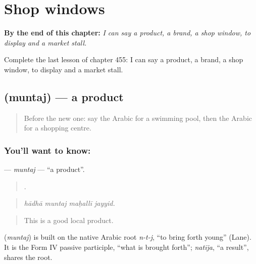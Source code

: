 
\chapter{Shop windows}
\label{ch:ar-shop-windows}

\begin{chapteropening}
\textbf{By the end of this chapter:} \emph{I can say a product, a brand, a shop window, to display and a market stall.}

Complete the last lesson of chapter 455: I can say a product, a brand, a shop window, to display and a market stall.
\end{chapteropening}

\section[\texorpdfstring{\ar{منتج} (muntaj)}{منتج (muntaj)}]{ (muntaj) — a product}

\label{lesson:AR-C455-muntaj}



\begin{quote}
Before the new one: say the Arabic for a swimming pool, then the Arabic for a shopping centre.
\end{quote}

\subsection*{You'll want to know: }
\textbf{} — \emph{muntaj} — \textquotedblleft{}a product\textquotedblright{}.

\begin{quote}
   .
\end{quote}

\begin{quote}
\emph{hādhā muntaj maḥallī jayyid.}
\end{quote}

\begin{quote}
This is a good local product.
\end{quote}

\begin{cousinweb}
\textbf{} (\emph{muntaj}) is built on the native Arabic root \emph{n-t-j}, \textquotedblleft{}to bring forth young\textquotedblright{} (Lane). It is the Form IV passive participle, \textquotedblleft{}what is brought forth\textquotedblright{}; \emph{natīja}, \textquotedblleft{}a result\textquotedblright{}, shares the root.
\end{cousinweb}

